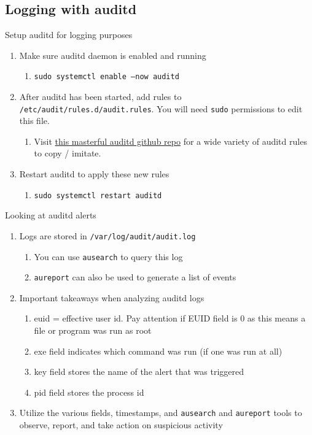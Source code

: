 \documentclass[12pt,letterpaper]{article}
\def\code#1{\textcolor{iris}{\texttt{#1}}}
\begin{document}
\subsection{Logging with auditd}

Setup auditd for logging purposes
\begin{enumerate}
	\item Make sure auditd daemon is enabled and running
		\begin{enumerate}
			\item \code{sudo systemctl enable --now auditd}
		\end{enumerate}
	\item After auditd has been started, add rules to \code{/etc/audit/rules.d/audit.rules}. You will need \code{sudo} permissions to edit this file.
		\begin{enumerate}
			\item Visit \href{https://github.com/Neo23x0/auditd/blob/master/audit.rules}{this masterful auditd github repo} for a wide variety of auditd rules to copy / imitate.
		\end{enumerate}
	\item Restart auditd to apply these new rules
		\begin{enumerate}
			\item \code{sudo systemctl restart auditd}
		\end{enumerate}
\end{enumerate}

Looking at auditd alerts
\begin{enumerate}
	\item Logs are stored in \code{/var/log/audit/audit.log}
		\begin{enumerate}
			\item You can use \code{ausearch} to query this log
			\item \code{aureport} can also be used to generate a list of events
		\end{enumerate}
	\item Important takeaways when analyzing auditd logs
		\begin{enumerate}
			\item euid = effective user id. Pay attention if EUID field is 0 as this means a file or program was run as root
			\item exe field indicates which command was run (if one was run at all)
			\item key field stores the name of the alert that was triggered
			\item pid field stores the process id
		\end{enumerate}
	\item Utilize the various fields, timestamps, and \code{ausearch} and \code{aureport} tools to observe, report, and take action on suspicious activity
\end{enumerate}
\end{document}
